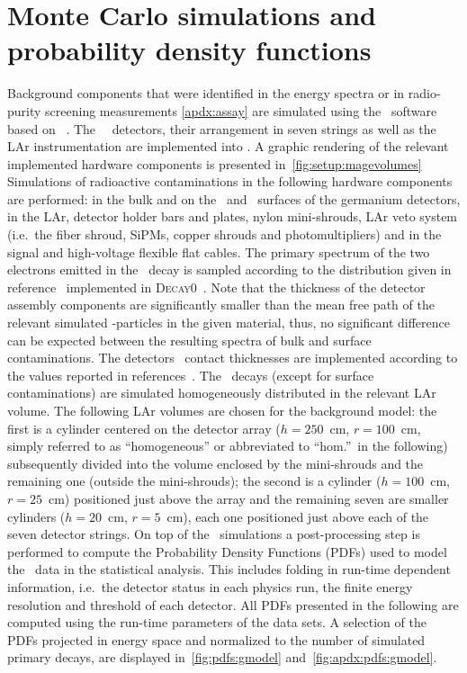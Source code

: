 
\chapter{Monte Carlo simulations and probability density functions}

Background components that were identified in the energy spectra or in
radio-purity screening measurements \cref{apdx:assay} are simulated
using the \mage\ software~\cite{bBoswell2011} based on
\geant~\cite{Agostinelli2002, Allison2006, Allison2016}.  The \gerda\
\phasetwo\ detectors, their arrangement in seven strings as well as the
LAr instrumentation are implemented into \mage. A graphic rendering of
the relevant implemented hardware components is presented
in~\cref{fig:setup:magevolumes}
\newpar
Simulations of radioactive contaminations
in the following hardware components are performed: in the bulk and on
the \pplus\ and \nplus\ surfaces of the germanium detectors, in the LAr,
detector holder bars and plates, nylon mini-shrouds, LAr veto system
(i.e.~the fiber shroud, SiPMs, copper shrouds and photomultipliers) and
in the signal and high-voltage flexible flat cables. The primary
spectrum of the two electrons emitted in the \nnbb\ decay is sampled
according to the distribution given in reference~\cite{Tretyak1995}
implemented in \textsc{Decay0}~\cite{Ponkratenko2000}. Note that the
thickness of the detector assembly components are significantly smaller
than the mean free path of the relevant simulated \g-particles in
the given material, thus, no significant difference can be expected
between the resulting spectra of bulk and surface contaminations. The
detectors \nplus\ contact thicknesses are implemented according to the
values reported in references~\cite{Agostini2013a, Agostini2019}.
\newpar
The \kvz\ decays (except for surface contaminations) are simulated
homogeneously distributed in the relevant LAr volume. The following LAr
volumes are chosen for the background model: the first is a cylinder
centered on the detector array ($h=250$~cm, $r=100$~cm, simply referred
to as ``homogeneous'' or abbreviated to ``hom.''~in the following)
subsequently divided into the volume enclosed by the mini-shrouds and
the remaining one (outside the mini-shrouds); the second is a cylinder
($h=100$~cm, $r=25$~cm) positioned just above the array and the
remaining seven are smaller cylinders ($h=20$~cm, $r=5$~cm), each one
positioned just above each of the seven detector strings.
\newpar
On top of the \mage\ simulations a post-processing step is performed to
compute the Probability Density Functions (PDFs) used to model the
\gerda\ data in the statistical analysis. This includes folding in
run-time dependent information, i.e.~the detector status in each physics
run, the finite energy resolution and threshold of each detector. All
PDFs presented in the following are computed using the run-time
parameters of the data sets. A selection of the PDFs projected in energy
space and normalized to the number of simulated primary decays, are
displayed in~\autoref{fig:pdfs:gmodel}
and~\autoref{fig:apdx:pdfs:gmodel}.

